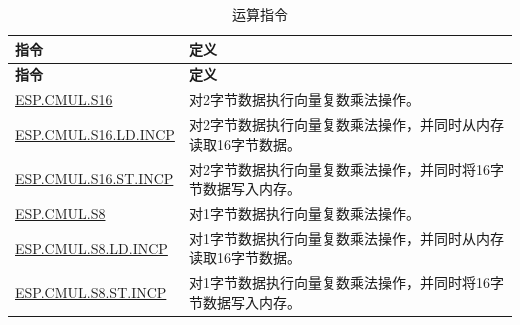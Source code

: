\begin{longtable}[c]{|l|m{10cm}|}
    \caption{运算指令}
    \label{tab:pie-complex-instructions}\\
    \hline
    \rowcolor{lightgray}
    \textbf{指令} & \textbf{定义} \\\hline
    \endfirsthead
    \rowcolor{lightgray}
    \textbf{指令} & \textbf{定义} \\\hline
    \endhead
    \endfoot

    \hyperref[instruction:ESPCMULS16]{ESP.CMUL.S16} & 对2字节数据执行向量复数乘法操作。 \\\hline
    \hyperref[instruction:ESPCMULS16LDINCP]{ESP.CMUL.S16.LD.INCP} & 对2字节数据执行向量复数乘法操作，并同时从内存读取16字节数据。 \\\hline
    \hyperref[instruction:ESPCMULS16STINCP]{ESP.CMUL.S16.ST.INCP} & 对2字节数据执行向量复数乘法操作，并同时将16字节数据写入内存。 \\\hline
    \hyperref[instruction:ESPCMULS8]{ESP.CMUL.S8} & 对1字节数据执行向量复数乘法操作。 \\\hline
    \hyperref[instruction:ESPCMULS8LDINCP]{ESP.CMUL.S8.LD.INCP} & 对1字节数据执行向量复数乘法操作，并同时从内存读取16字节数据。 \\\hline
    \hyperref[instruction:ESPCMULS8STINCP]{ESP.CMUL.S8.ST.INCP} & 对1字节数据执行向量复数乘法操作，并同时将16字节数据写入内存。 \\\hline
\end{longtable}